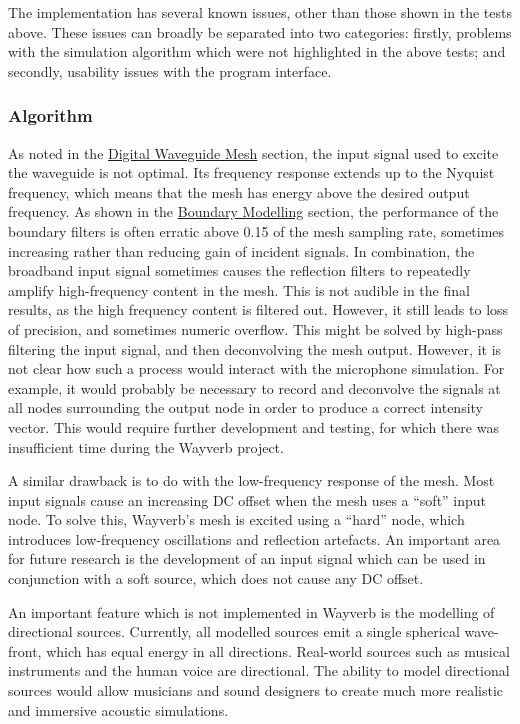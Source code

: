 \documentclass[]{scrreprt}
\begin{document}
The implementation has several known issues, other than those shown in
the tests above. These issues can broadly be separated into two
categories: firstly, problems with the simulation algorithm which were
not highlighted in the above tests; and secondly, usability issues with
the program interface.

\subsubsection{Algorithm}\label{algorithm}

As noted in the
\href{\%7B\%7B\%20site.baseurl\%20\%7D\%7D\%7B\%\%20link\%20waveguide.md\%20\%\%7D}{Digital
Waveguide Mesh} section, the input signal used to excite the waveguide
is not optimal. Its frequency response extends up to the Nyquist
frequency, which means that the mesh has energy above the desired output
frequency. As shown in the
\href{\%7B\%7B\%20site.baseurl\%20\%7D\%7D\%7B\%\%20link\%20boundary.md\%20\%\%7D}{Boundary
Modelling} section, the performance of the boundary filters is often
erratic above 0.15 of the mesh sampling rate, sometimes increasing
rather than reducing gain of incident signals. In combination, the
broadband input signal sometimes causes the reflection filters to
repeatedly amplify high-frequency content in the mesh. This is not
audible in the final results, as the high frequency content is filtered
out. However, it still leads to loss of precision, and sometimes numeric
overflow. This might be solved by high-pass filtering the input signal,
and then deconvolving the mesh output. However, it is not clear how such
a process would interact with the microphone simulation. For example, it
would probably be necessary to record and deconvolve the signals at all
nodes surrounding the output node in order to produce a correct
intensity vector. This would require further development and testing,
for which there was insufficient time during the Wayverb project.

A similar drawback is to do with the low-frequency response of the mesh.
Most input signals cause an increasing DC offset when the mesh uses a
``soft'' input node. To solve this, Wayverb's mesh is excited using a
``hard'' node, which introduces low-frequency oscillations and
reflection artefacts. An important area for future research is the
development of an input signal which can be used in conjunction with a
soft source, which does not cause any DC offset.

An important feature which is not implemented in Wayverb is the
modelling of directional sources. Currently, all modelled sources emit a
single spherical wave-front, which has equal energy in all directions.
Real-world sources such as musical instruments and the human voice are
directional. The ability to model directional sources would allow
musicians and sound designers to create much more realistic and
immersive acoustic simulations.
\end{document}
